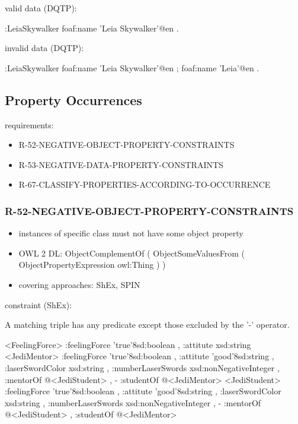 \documentclass{llncs}
\begin{document}
valid data (DQTP):

\begin{ex}
:LeiaSkywalker
    foaf:name 'Leia Skywalker'@en .
\end{ex}

invalid data (DQTP):

\begin{ex}
:LeiaSkywalker
    foaf:name 'Leia Skywalker'@en ;
    foaf:name 'Leia'@en .
\end{ex}

\subsection{Property Occurrences}

requirements:

\begin{itemize}
	\item R-52-NEGATIVE-OBJECT-PROPERTY-CONSTRAINTS
	\item R-53-NEGATIVE-DATA-PROPERTY-CONSTRAINTS
	\item R-67-CLASSIFY-PROPERTIES-ACCORDING-TO-OCCURRENCE
\end{itemize}

\subsubsection{R-52-NEGATIVE-OBJECT-PROPERTY-CONSTRAINTS}

\begin{itemize}
	\item instances of specific class must not have some object property
  \item OWL 2 DL: ObjectComplementOf ( ObjectSomeValuesFrom ( ObjectPropertyExpression owl:Thing ) )
	\item covering approaches: ShEx, SPIN
\end{itemize}

constraint (ShEx):

A matching triple has any predicate except those excluded by the '-' operator.

\begin{ex}
<FeelingForce> {
    :feelingForce 'true'^^xsd:boolean ,
    :attitute xsd:string }
<JediMentor> {
    :feelingForce 'true'^^xsd:boolean ,
    :attitute 'good'^^xsd:string ,
    :laserSwordColor xsd:string ,
    :numberLaserSwords xsd:nonNegativeInteger ,
    :mentorOf @<JediStudent> ,
    - :studentOf @<JediMentor> }
<JediStudent> {
    :feelingForce 'true'^^xsd:boolean ,
    :attitute 'good'^^xsd:string ,
    :laserSwordColor xsd:string ,
    :numberLaserSwords xsd:nonNegativeInteger ,
    - :mentorOf @<JediStudent> ,
    :studentOf @<JediMentor> }
\end{ex}
\end{document}
